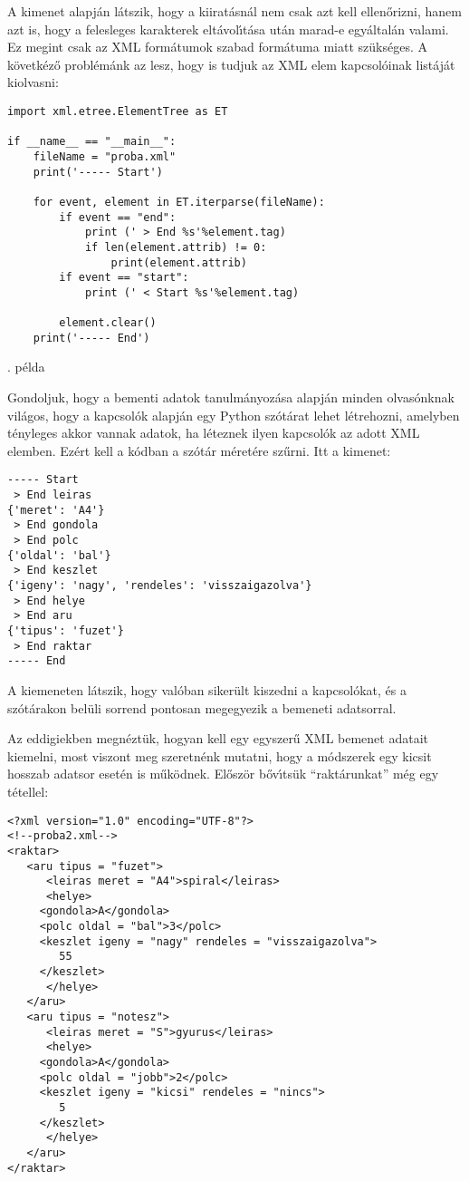 \noindent A kimenet alapj\'an l\'atszik, hogy a kiirat\'asn\'al nem csak azt kell ellen\H{o}rizni, 
hanem azt is, hogy a felesleges karakterek elt\'avol\'{\i}t\'asa ut\'an marad-e egy\'altal\'an 
valami. Ez megint csak az XML form\'atumok szabad form\'atuma miatt sz\"uks\'eges. A k\"ovetk\'ez\H{o} 
probl\'em\'ank az lesz, hogy is tudjuk az XML elem kapcsol\'oinak list\'aj\'at kiolvasni:

\incminta
\begin{Verbatim}[fontsize=\small]
import xml.etree.ElementTree as ET

if __name__ == "__main__":
    fileName = "proba.xml"
    print('----- Start')

    for event, element in ET.iterparse(fileName):
        if event == "end":
            print (' > End %s'%element.tag)
            if len(element.attrib) != 0:
                print(element.attrib)
        if event == "start":
            print (' < Start %s'%element.tag)

        element.clear()
    print('----- End')    
\end{Verbatim}
\theminta. p\'elda

\noindent Gondoljuk, hogy a bementi adatok tanulm\'anyoz\'asa alapj\'an minden olvas\'onknak 
vil\'agos, hogy a kapcsol\'ok alapj\'an egy Python sz\'ot\'arat lehet l\'etrehozni, amelyben 
t\'enyleges akkor vannak adatok, ha l\'eteznek ilyen kapcsol\'ok az adott XML elemben. Ez\'ert 
kell a k\'odban a sz\'ot\'ar  m\'eret\'ere sz\H{u}rni. Itt a kimenet:

\begin{Verbatim}[fontsize=\small]
----- Start
 > End leiras
{'meret': 'A4'}
 > End gondola
 > End polc
{'oldal': 'bal'}
 > End keszlet
{'igeny': 'nagy', 'rendeles': 'visszaigazolva'}
 > End helye
 > End aru
{'tipus': 'fuzet'}
 > End raktar
----- End
\end{Verbatim}

\noindent A kiemeneten l\'atszik, hogy val\'oban siker\"ult kiszedni a kapcsol\'okat, \'es a 
sz\'ot\'arakon bel\"uli sorrend pontosan megegyezik a bemeneti adatsorral. 

Az eddigiekben megn\'ezt\"uk, hogyan kell egy egyszer\H{u} XML bemenet adatait kiemelni, most 
viszont meg szeretn\'enk mutatni, hogy a m\'odszerek egy kicsit hosszab adatsor eset\'en is 
m\H{u}k\"odnek. El\H{o}sz\"or b\H{o}v\'{\i}ts\"uk ``rakt\'arunkat'' m\'eg egy t\'etellel:

\begin{Verbatim}[fontsize=\small]
<?xml version="1.0" encoding="UTF-8"?>
<!--proba2.xml-->
<raktar>
   <aru tipus = "fuzet">
      <leiras meret = "A4">spiral</leiras>
      <helye>
	 <gondola>A</gondola>
	 <polc oldal = "bal">3</polc>
	 <keszlet igeny = "nagy" rendeles = "visszaigazolva">
	    55
	 </keszlet>
      </helye>
   </aru>
   <aru tipus = "notesz">
      <leiras meret = "S">gyurus</leiras>
      <helye>
	 <gondola>A</gondola>
	 <polc oldal = "jobb">2</polc>
	 <keszlet igeny = "kicsi" rendeles = "nincs">
	    5
	 </keszlet>
      </helye>
   </aru>
</raktar>
\end{Verbatim}

